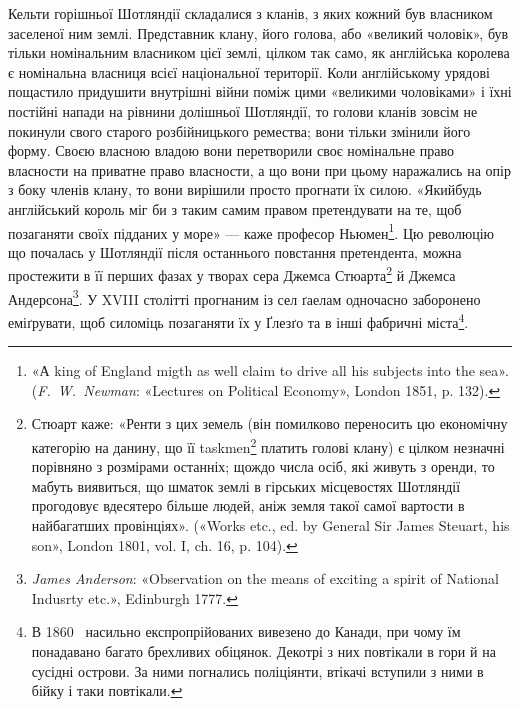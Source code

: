 Кельти горішньої Шотляндії складалися з кланів, з яких
кожний був власником заселеної ним землі. Представник клану,
його голова, або «великий чоловік», був тільки номінальним власником цієї землі,
цілком так само, як англійська королева є номінальна власниця всієї
національної території. Коли англійському урядові пощастило придушити
внутрішні війни поміж цими «великими чоловіками» і їхні
постійні напади на рівнини долішньої Шотляндії, то голови кланів
зовсім не покинули свого старого розбійницького ремества;
вони тільки змінили його форму. Своєю власною владою вони перетворили своє
номінальне право власности на приватне право власности,
а що вони при цьому наражались на опір з боку членів клану, то вони
вирішили просто прогнати їх силою. «Якийбудь англійський король міг би з
таким самим правом претендувати на те, щоб позаганяти своїх підданих у море»
— каже професор Ньюмен\footnote{
«А king of England migth as well claim to drive all his subjects into the sea».
(\emph{F.~W.~Newman}: «Lectures on Political Economy», London 1851, p. 132).
}. Цю революцію що почалась у Шотляндії після останнього повстання претендента,
можна простежити в її перших фазах у творах сера Джемса Стюарта\footnote{
Стюарт каже: «Ренти з цих земель (він помилково переносить цю економічну
категорію на данину, що її taskmen\footnote*{
васаль. \emph{Ред.}
} платить голові клану) є цілком незначні порівняно з розмірами останніх;
щождо числа осіб, які живуть з оренди, то мабуть виявиться, що шматок
землі в гірських місцевостях Шотляндії прогодовує вдесятеро більше людей,
аніж земля такої самої вартости в найбагатших провінціях».
(«Works etc., ed. by General Sir James Steuart, his son», London 1801, vol. I,
ch. 16, p. 104).
} й Джемса Андерсона\footnote{
\emph{James Anderson}: «Observation on the means of exciting a spirit of
National Indusrty etc.», Edinburgh 1777.
}. У XVIII столітті
прогнаним із сел ґаелам одночасно заборонено еміґрувати,
щоб силоміць позаганяти їх у Ґлезґо та в інші фабричні міста\footnote{
В 1860~ насильно експропрійованих вивезено до Канади, при
чому їм понадавано багато брехливих обіцянок. Декотрі з них повтікали
в гори й на сусідні острови. За ними погнались поліціянти, втікачі вступили
з ними в бійку і таки повтікали.
}.
